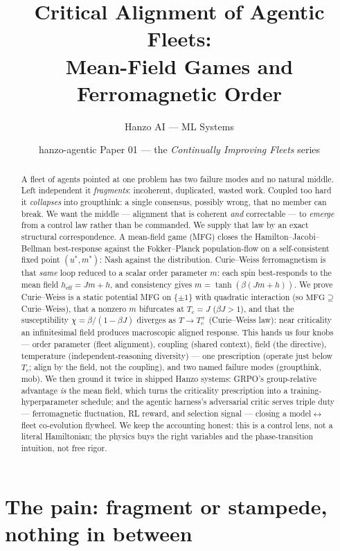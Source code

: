\documentclass[11pt]{article}
\title{\textbf{Critical Alignment of Agentic Fleets:\\ Mean-Field Games and Ferromagnetic Order}}
\author{Hanzo AI --- ML Systems}
\date{hanzo-agentic Paper 01 --- the \emph{Continually Improving Fleets} series}
\newcommand{\heff}{h_{\mathrm{eff}}}
\begin{document}
\maketitle

\begin{abstract}
A fleet of agents pointed at one problem has two failure modes and no natural middle. Left independent it
\emph{fragments}: incoherent, duplicated, wasted work. Coupled too hard it \emph{collapses} into groupthink:
a single consensus, possibly wrong, that no member can break. We want the middle --- alignment that is
coherent \emph{and} correctable --- to \emph{emerge} from a control law rather than be commanded. We supply
that law by an exact structural correspondence. A mean-field game (MFG) closes the Hamilton--Jacobi--Bellman
best-response against the Fokker--Planck population-flow on a self-consistent fixed point
$(u^{*},m^{*})$: Nash against the distribution. Curie--Weiss ferromagnetism is that \emph{same} loop reduced
to a scalar order parameter $m$: each spin best-responds to the mean field $\heff = Jm + h$, and consistency
gives $m=\tanh(\beta(Jm+h))$. We prove Curie--Weiss is a static potential MFG on $\{\pm1\}$ with quadratic
interaction (so $\mathrm{MFG}\supseteq$ Curie--Weiss), that a nonzero $m$ bifurcates at $T_c=J$
($\beta J>1$), and that the susceptibility $\chi=\beta/(1-\beta J)$ diverges as $T\to T_c^{+}$ (Curie--Weiss
law): near criticality an infinitesimal field produces macroscopic aligned response. This hands us four
knobs --- order parameter (fleet alignment), coupling (shared context), field (the directive), temperature
(independent-reasoning diversity) --- one prescription (operate just below $T_c$; align by the field, not the
coupling), and two named failure modes (groupthink, mob). We then ground it twice in shipped Hanzo systems:
GRPO's group-relative advantage \emph{is} the mean field, which turns the criticality prescription into a
training-hyperparameter schedule; and the agentic harness's adversarial critic serves triple duty ---
ferromagnetic fluctuation, RL reward, and selection signal --- closing a model$\leftrightarrow$fleet
co-evolution flywheel. We keep the accounting honest: this is a control lens, not a literal Hamiltonian; the
physics buys the right variables and the phase-transition intuition, not free rigor.
\end{abstract}

\section{The pain: fragment or stampede, nothing in between}
\label{sec:pain}
\end{document}
